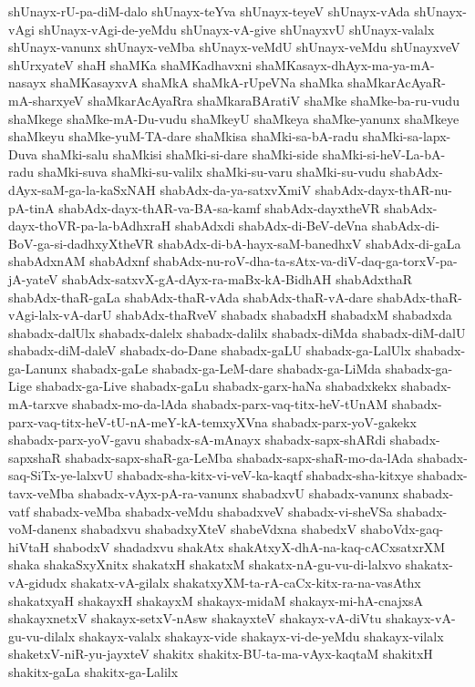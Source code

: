 {shUnayx-rU-pa-diM-dalo
shUnayx-teYva
shUnayx-teyeV
shUnayx-vAda
shUnayx-vAgi
shUnayx-vAgi-de-yeMdu
shUnayx-vA-give
shUnayxvU
shUnayx-valalx
shUnayx-vanunx
shUnayx-veMba
shUnayx-veMdU
shUnayx-veMdu
shUnayxveV
shUrxyateV
shaH
shaMKa
shaMKadhavxni
shaMKasayx-dhAyx-ma-ya-mA-nasayx
shaMKasayxvA
shaMkA
shaMkA-rUpeVNa
shaMka
shaMkarAcAyaR-mA-sharxyeV
shaMkarAcAyaRra
shaMkaraBAratiV
shaMke
shaMke-ba-ru-vudu
shaMkege
shaMke-mA-Du-vudu
shaMkeyU
shaMkeya
shaMke-yanunx
shaMkeye
shaMkeyu
shaMke-yuM-TA-dare
shaMkisa
shaMki-sa-bA-radu
shaMki-sa-lapx-Duva
shaMki-salu
shaMkisi
shaMki-si-dare
shaMki-side
shaMki-si-heV-La-bA-radu
shaMki-suva
shaMki-su-valilx
shaMki-su-varu
shaMki-su-vudu
shabAdx-dAyx-saM-ga-la-kaSxNAH
shabAdx-da-ya-satxvXmiV
shabAdx-dayx-thAR-nu-pA-tinA
shabAdx-dayx-thAR-va-BA-sa-kamf
shabAdx-dayxtheVR
shabAdx-dayx-thoVR-pa-la-bAdhxraH
shabAdxdi
shabAdx-di-BeV-deVna
shabAdx-di-BoV-ga-si-dadhxyXtheVR
shabAdx-di-bA-hayx-saM-banedhxV
shabAdx-di-gaLa
shabAdxnAM
shabAdxnf
shabAdx-nu-roV-dha-ta-sAtx-va-diV-daq-ga-torxV-pa-jA-yateV
shabAdx-satxvX-gA-dAyx-ra-maBx-kA-BidhAH
shabAdxthaR
shabAdx-thaR-gaLa
shabAdx-thaR-vAda
shabAdx-thaR-vA-dare
shabAdx-thaR-vAgi-lalx-vA-darU
shabAdx-thaRveV
shabadx
shabadxH
shabadxM
shabadxda
shabadx-dalUlx
shabadx-dalelx
shabadx-dalilx
shabadx-diMda
shabadx-diM-dalU
shabadx-diM-daleV
shabadx-do-Dane
shabadx-gaLU
shabadx-ga-LalUlx
shabadx-ga-Lanunx
shabadx-gaLe
shabadx-ga-LeM-dare
shabadx-ga-LiMda
shabadx-ga-Lige
shabadx-ga-Live
shabadx-gaLu
shabadx-garx-haNa
shabadxkekx
shabadx-mA-tarxve
shabadx-mo-da-lAda
shabadx-parx-vaq-titx-heV-tUnAM
shabadx-parx-vaq-titx-heV-tU-nA-meY-kA-temxyXVna
shabadx-parx-yoV-gakekx
shabadx-parx-yoV-gavu
shabadx-sA-mAnayx
shabadx-sapx-shARdi
shabadx-sapxshaR
shabadx-sapx-shaR-ga-LeMba
shabadx-sapx-shaR-mo-da-lAda
shabadx-saq-SiTx-ye-lalxvU
shabadx-sha-kitx-vi-veV-ka-kaqtf
shabadx-sha-kitxye
shabadx-tavx-veMba
shabadx-vAyx-pA-ra-vanunx
shabadxvU
shabadx-vanunx
shabadx-vatf
shabadx-veMba
shabadx-veMdu
shabadxveV
shabadx-vi-sheVSa
shabadx-voM-danenx
shabadxvu
shabadxyXteV
shabeVdxna
shabedxV
shaboVdx-gaq-hiVtaH
shabodxV
shadadxvu
shakAtx
shakAtxyX-dhA-na-kaq-cACxsatxrXM
shaka
shakaSxyXnitx
shakatxH
shakatxM
shakatx-nA-gu-vu-di-lalxvo
shakatx-vA-gidudx
shakatx-vA-gilalx
shakatxyXM-ta-rA-caCx-kitx-ra-na-vasAthx
shakatxyaH
shakayxH
shakayxM
shakayx-midaM
shakayx-mi-hA-cnajxsA
shakayxnetxV
shakayx-setxV-nAsw
shakayxteV
shakayx-vA-diVtu
shakayx-vA-gu-vu-dilalx
shakayx-valalx
shakayx-vide
shakayx-vi-de-yeMdu
shakayx-vilalx
shaketxV-niR-yu-jayxteV
shakitx
shakitx-BU-ta-ma-vAyx-kaqtaM
shakitxH
shakitx-gaLa
shakitx-ga-Lalilx
}
